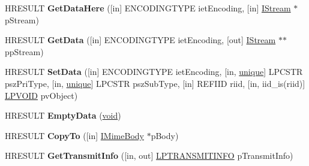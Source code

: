 \begin{DoxyCompactItemize}
\item 
\mbox{\label{interface_m_i_m_e_o_l_e_1_1_i_mime_body_a9bdcfe8acfe90421cda36d19cdb74723}} 
H\+R\+E\+S\+U\+LT {\bfseries Get\+Data\+Here} (\mbox{[}in\mbox{]} E\+N\+C\+O\+D\+I\+N\+G\+T\+Y\+PE iet\+Encoding, \mbox{[}in\mbox{]} \hyperlink{interface_i_stream}{I\+Stream} $\ast$p\+Stream)
\item 
\mbox{\label{interface_m_i_m_e_o_l_e_1_1_i_mime_body_a6bd6be6b88971a49bc1b3e9de07714aa}} 
H\+R\+E\+S\+U\+LT {\bfseries Get\+Data} (\mbox{[}in\mbox{]} E\+N\+C\+O\+D\+I\+N\+G\+T\+Y\+PE iet\+Encoding, \mbox{[}out\mbox{]} \hyperlink{interface_i_stream}{I\+Stream} $\ast$$\ast$pp\+Stream)
\item 
\mbox{\label{interface_m_i_m_e_o_l_e_1_1_i_mime_body_ad65f99ef382aab23dec1a5e301aea93e}} 
H\+R\+E\+S\+U\+LT {\bfseries Set\+Data} (\mbox{[}in\mbox{]} E\+N\+C\+O\+D\+I\+N\+G\+T\+Y\+PE iet\+Encoding, \mbox{[}in, \hyperlink{interfaceunique}{unique}\mbox{]} L\+P\+C\+S\+TR psz\+Pri\+Type, \mbox{[}in, \hyperlink{interfaceunique}{unique}\mbox{]} L\+P\+C\+S\+TR psz\+Sub\+Type, \mbox{[}in\mbox{]} R\+E\+F\+I\+ID riid, \mbox{[}in, iid\+\_\+is(riid)\mbox{]} \hyperlink{interfacevoid}{L\+P\+V\+O\+ID} pv\+Object)
\item 
\mbox{\label{interface_m_i_m_e_o_l_e_1_1_i_mime_body_a17b29ce0979471342f24271442a66099}} 
H\+R\+E\+S\+U\+LT {\bfseries Empty\+Data} (\hyperlink{interfacevoid}{void})
\item 
\mbox{\label{interface_m_i_m_e_o_l_e_1_1_i_mime_body_a296f8d055a2972664da6d0a3cdc8a880}} 
H\+R\+E\+S\+U\+LT {\bfseries Copy\+To} (\mbox{[}in\mbox{]} \hyperlink{interface_m_i_m_e_o_l_e_1_1_i_mime_body}{I\+Mime\+Body} $\ast$p\+Body)
\item 
\mbox{\label{interface_m_i_m_e_o_l_e_1_1_i_mime_body_a01ebccf27d585e5471b9ff6380947087}} 
H\+R\+E\+S\+U\+LT {\bfseries Get\+Transmit\+Info} (\mbox{[}in, out\mbox{]} \hyperlink{struct_m_i_m_e_o_l_e_1_1_i_mime_body_1_1tag_t_r_a_n_s_m_i_t_i_n_f_o}{L\+P\+T\+R\+A\+N\+S\+M\+I\+T\+I\+N\+FO} p\+Transmit\+Info)
\item 
$$
\end{DoxyCompactItemize}
